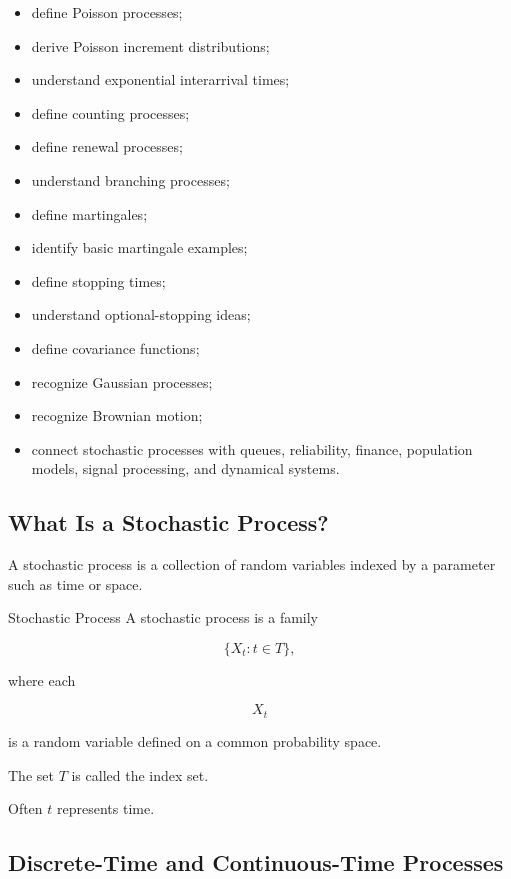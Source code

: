 {\begin{itemize}
    \item define Poisson processes;
    \item derive Poisson increment distributions;
    \item understand exponential interarrival times;
    \item define counting processes;
    \item define renewal processes;
    \item understand branching processes;
    \item define martingales;
    \item identify basic martingale examples;
    \item define stopping times;
    \item understand optional-stopping ideas;
    \item define covariance functions;
    \item recognize Gaussian processes;
    \item recognize Brownian motion;
    \item connect stochastic processes with queues, reliability,
          finance, population models, signal processing, and dynamical
          systems.
\end{itemize}
}

\subsection{What Is a Stochastic Process?}
\label{subsec:what-is-stochastic-process}

A stochastic process is a collection of random variables indexed by a
parameter such as time or space.

\begin{definitionbox}{Stochastic Process}
A stochastic process is a family

\[
\boxed{
\{X_t:t\in T\},
}
\]

where each

\[
X_t
\]

is a random variable defined on a common probability space.

The set \(T\) is called the index set.
\end{definitionbox}

Often \(t\) represents time.

\subsection{Discrete-Time and Continuous-Time Processes}
\label{subsec:discrete-continuous-time-processes}

